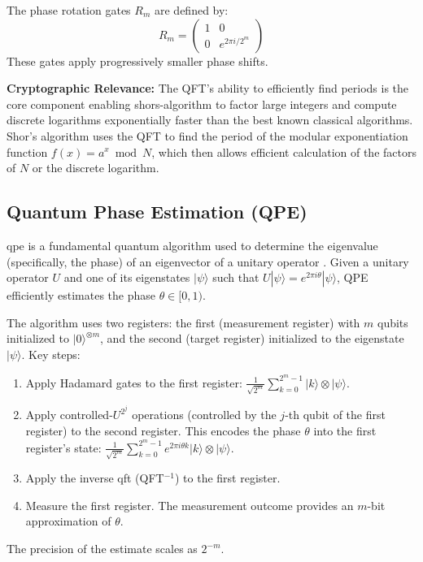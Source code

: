 The phase rotation gates $R_m$ are defined by:
\begin{equation}\label{eq:phase_gate}
    R_m = \begin{pmatrix} 1 & 0 \\ 0 & e^{2\pi i /2^m} \end{pmatrix}
\end{equation}
These gates apply progressively smaller phase shifts.

\textbf{Cryptographic Relevance:} The QFT's ability to efficiently find periods is the core component enabling \gls{shors-algorithm} to factor large integers and compute discrete logarithms exponentially faster than the best known classical algorithms. Shor's algorithm uses the QFT to find the period of the modular exponentiation function $f(x) = a^x \bmod N$, which then allows efficient calculation of the factors of $N$ or the discrete logarithm.

\subsection{Quantum Phase Estimation (QPE)}\label{subsec:qpe}
\Gls{qpe} is a fundamental quantum algorithm used to determine the eigenvalue (specifically, the phase) of an eigenvector of a unitary operator \parencite{wikipediaQPE}. Given a unitary operator $U$ and one of its eigenstates $|\psi\rangle$ such that $U|\psi\rangle = e^{2\pi i\theta}|\psi\rangle$, QPE efficiently estimates the phase $\theta \in [0, 1)$.

The algorithm uses two registers: the first (measurement register) with $m$ qubits initialized to $|0\rangle^{\otimes m}$, and the second (target register) initialized to the eigenstate $|\psi\rangle$.
Key steps:
\begin{enumerate}
    \item Apply Hadamard gates to the first register: $\frac{1}{\sqrt{2^m}}\sum_{k=0}^{2^m-1}|k\rangle \otimes |\psi\rangle$.
    \item Apply controlled-$U^{2^j}$ operations (controlled by the $j$-th qubit of the first register) to the second register. This encodes the phase $\theta$ into the first register's state: $\frac{1}{\sqrt{2^m}} \sum_{k=0}^{2^m-1} e^{2\pi i\theta k} |k\rangle \otimes |\psi\rangle$.
    \item Apply the inverse \Gls{qft} (QFT$^{-1}$) to the first register.
    \item Measure the first register. The measurement outcome provides an $m$-bit approximation of $\theta$.
\end{enumerate}
The precision of the estimate scales as $2^{-m}$.

